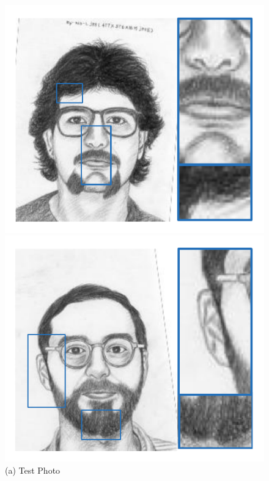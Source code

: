 \documentclass[10pt,twocolumn,letterpaper]{article}
\begin{document}
\begin{figure}[htbp]
\begin{minipage}[t]{0.138\linewidth}
\includegraphics[width=0.99\linewidth]{img/example3_gro.pdf}
\includegraphics[width=0.99\linewidth]{img/example4_gro.pdf}
(a) Test Photo
\end{minipage}
\begin{minipage}[t]{0.138\linewidth}
\centering

\end{minipage}
\end{figure}
\end{document}
